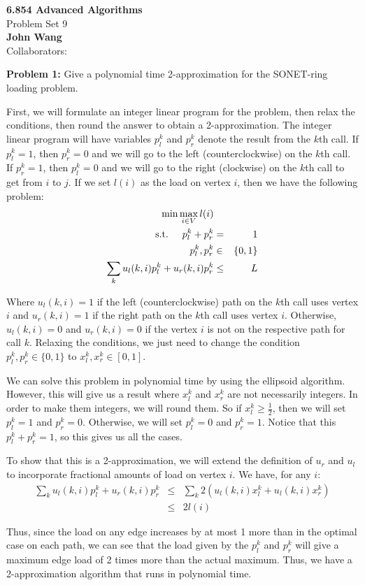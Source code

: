 \documentclass[psamsfonts]{amsart}
\newenvironment{sol}{\vspace{0.25cm}{\large \bfseries Solution:}}{\qedsymbol}
\newenvironment{prob}[1]{\begin{framed}{\large \bfseries Problem #1:}}{\end{framed}}
\newcommand{\makenewtitle}{
    \begin{center}
    {\huge \bfseries 6.854 Advanced Algorithms} \\
    Problem Set 9\\
    \vspace{0.25cm}
    {\bfseries John Wang} \\
    Collaborators:  
    \end{center}
    \vspace{0.5cm}
}
\begin{document}
\makenewtitle

\begin{prob}{1}
Give a polynomial time 2-approximation for the SONET-ring loading problem.
\end{prob}

\begin{sol}
First, we will formulate an integer linear program for the problem, then relax the conditions, then round the answer to obtain a 2-approximation. The integer linear program will have variables $p_{l}^k$ and $p_{r}^k$ denote the result from the $k$th call. If $p_{l}^k = 1$, then $p_{r}^k = 0$ and we will go to the left (counterclockwise) on the $k$th call. If $p_{r}^k = 1$, then $p_{l}^k = 0$ and we will go to the right (clockwise) on the $k$th call to get from $i$ to $j$. If we set $l(i)$ as the load on vertex $i$, then we have the following problem:
\begin{eqnarray}
\min \max_{i \in V} l(i) \\
\text{s.t.} \hspace{0.5cm} p_{l}^k + p_{r}^k &=& 1 \\
p_{l}^k, p_{r}^k &\in& \{0, 1\} \\
\sum_{k} u_l(k,i) p_{l}^k + u_r(k,i) p_r^k &\leq& L 
\end{eqnarray}

Where $u_l(k,i) = 1$ if the left (counterclockwise) path on the $k$th call uses vertex $i$ and $u_r(k,i) = 1$ if the right path on the $k$th call uses vertex $i$. Otherwise, $u_l(k,i) = 0$ and $u_r(k,i) = 0$ if the vertex $i$ is not on the respective path for call $k$. Relaxing the conditions, we just need to change the condition $p_{l}^k, p_{r}^k \in \{0, 1\} $ to $x_{l}^k, x_{r}^k \in [0, 1]$. 

We can solve this problem in polynomial time by using the ellipsoid algorithm. However, this will give us a result where $x_l^k$ and $x_r^k$ are not necessarily integers. In order to make them integers, we will round them. So if $x_l^k \geq \frac{1}{2}$, then we will set $p_l^k = 1$ and $p_r^k = 0$. Otherwise, we will set $p_l^k = 0$ and $p_r^k = 1$. Notice that this $p_l^k + p_r^k = 1$, so this gives us all the cases.

To show that this is a 2-approximation, we will extend the definition of $u_r$ and $u_l$ to incorporate fractional amounts of load on vertex $i$. We have, for any $i$:
\begin{eqnarray}
\sum_{k} u_l(k,i) p_l^k + u_r(k,i) p_r^k &\leq& \sum_{k} 2(u_l(k,i) x_l^k + u_l(k,i) x_r^k) \\
&\leq& 2 l(i) 
\end{eqnarray}

Thus, since the load on any edge increases by at most 1 more than in the optimal case on each path, we can see that the load given by the $p_l^k$ and $p_r^k$ will give a maximum edge load of 2 times more than the actual maximum. Thus, we have a 2-approximation algorithm that runs in polynomial time.
\end{sol}
\end{document}
